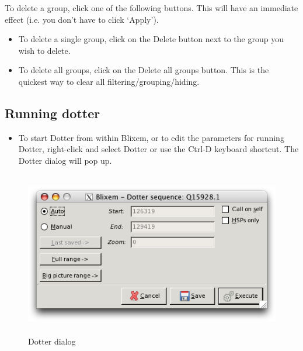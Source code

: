 \documentclass[letterpaper]{article}
\newcommand\liststyleWWviiiNumxxxvii{%
\renewcommand\labelitemi{{\textbullet}}
\renewcommand\labelitemii{o}
\renewcommand\labelitemiii{[F0A7?]}
\renewcommand\labelitemiv{[F0B7?]}
}
\begin{document}
\bigskip

To delete a group, click one of the following buttons. This will have an immediate effect (i.e. you don{\textquoteright}t have to click {\textquoteleft}Apply{\textquoteright}).

\liststyleWWviiiNumxxxvii
\begin{itemize}
\item {
To delete a single group, click on the
{\textquotesingle}Delete{\textquotesingle} button next to the group you
wish to delete.}
\item {
To delete all groups, click on the {\textquotesingle}Delete all groups{\textquotesingle} button. This is the quickest way to clear all filtering/grouping/hiding.}
\end{itemize}
{\color[rgb]{0.30980393,0.5058824,0.7411765}\subsection[Running dotter]{Running dotter}}
\hypertarget{RefHeading2161056909880}{}\liststyleWWviiiNumxxxvii
\begin{itemize}
\item {
To start Dotter from within Blixem, or to edit the parameters for
running Dotter, right-click and select
{\textquotesingle}Dotter{\textquotesingle} or use the Ctrl-D keyboard
shortcut. The Dotter dialog will pop up.}
\end{itemize}

\begin{figure}
\centering
\color[rgb]{0.30980393,0.5058824,0.7411765}
\includegraphics[width=13.215cm,height=7.165cm]{img_dialog_dotter.png}
\caption{Dotter dialog}
\end{figure}
\end{document}
